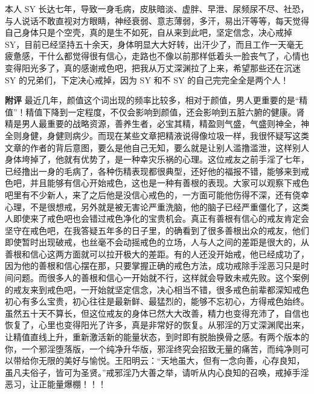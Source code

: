 \begin{case}
    本人 SY 长达七年，导致一身毛病，皮肤暗淡、虚胖、早泄、尿频尿不尽、社恐，与人说话不敢直视对方眼睛，神经衰弱、意志薄弱，多汗，易出汗等等，每天觉得自己身体只是个空壳，真的是生不如死，自从来到此吧，坚定信念，决心戒掉 SY，目前已经坚持五十余天，身体明显大大好转，出汗少了，而且工作一天毫无疲惫感，干什么都觉得很有信心，走路也不像以前那样低着头一脸丧气了，心情也变得阳光多了，真的感谢戒色吧，把我从万丈深渊拉了上来，希望那些还在沉迷 SY 的兄弟们，下定决心戒掉，因为 SY 和不 SY 的自己完完全全是两个人！

    \textbf{附评} 最近几年，颜值这个词出现的频率比较多，相对于颜值，男人更重要的是“精值”！精值下降到一定程度，不仅会影响到颜值，还会影响到五脏六腑的健康。肾精是男人最重要的战略资源，善养生者，必宝其精，精盈则气盛，气盛则神全，神全则身健，身健则病少。而现在某些文章把精液说得像垃圾一样，我很怀疑写这类文章的作者的背后意图，要么是他自己无知，要么就是让别人滥撸滥泄，这样别人身体垮掉了，他就有优势了，是一种幸灾乐祸的心理。这位戒友之前手淫了七年，已经撸出一身的毛病了，各种伤精表现都很典型，还好他的福报不错，能够来到戒色吧，并且能够有信心开始戒色，这也是一种有善根的表现。大家可以观察下戒色吧里有不少新人，来了之后他是没信心戒色的，一方面可能他伤得不深，还有侥幸心理，不是很想戒，另外就是被无害论严重洗脑，他的脑子已经严重僵化了，这类人即使来了戒色吧也会错过戒色净化的宝贵机会。真正有善根有信心的戒友肯定会坚守在戒色吧，在我答疑五年多的日子里，的确看到了很多善根出众的戒友，他们即使暂时出现破戒，也丝毫不会动摇戒色的立场，人与人之间的差距是很大的，从善根和信心这两方面就可以拉开极大的差距。有的人还没开始戒，他已经成功了，因为他的善根和信心摆在那，只要掌握正确的戒色方法，成功戒除手淫恶习只是时间问题。而很多人的善根和信心一开始就不行，这样就会导致未戒先败。这个案例的戒友来到戒色吧，一开始就坚定信念，决心相当不错，很多戒色前辈都深知戒色初心有多么宝贵，初心往往是最新鲜、最猛烈的，能够不忘初心，方得戒色始终。虽然五十天不算长，但这位戒友的身体已然大大改善，精力也变得充沛了，自信也恢复了，心里也变得阳光了许多，真是非常好的恢复。从邪淫的万丈深渊爬出来，让精值直线上升，重新激活新的能量状态，到时即有脱胎换骨之感。有两个版本的你，一个邪淫堕落版，一个纯净升华版，邪淫终究会招致无量的痛苦，而纯净则可以带给你无限的美好与愉悦。王阳明云：“天地虽大，但有一念向善，心存良知，虽凡夫俗子，皆可为圣贤。”戒邪淫乃大善之举，请听从内心良知的召唤，戒掉手淫恶习，让正能量爆棚！！！
\end{case}

